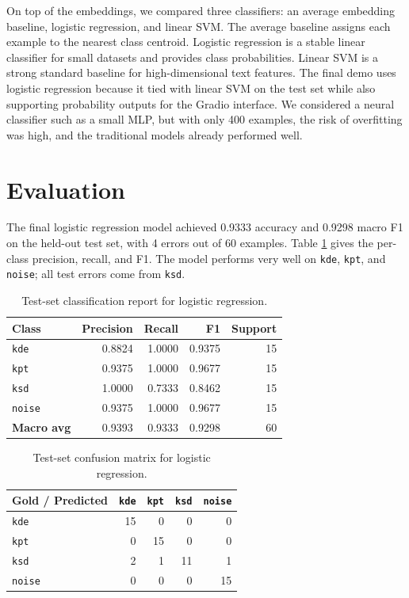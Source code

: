 \documentclass[11pt,a4paper]{article}
\begin{document}
On top of the embeddings, we compared three classifiers: an average embedding baseline, logistic regression, and linear SVM. The average baseline assigns each example to the nearest class centroid. Logistic regression is a stable linear classifier for small datasets and provides class probabilities. Linear SVM is a strong standard baseline for high-dimensional text features. The final demo uses logistic regression because it tied with linear SVM on the test set while also supporting probability outputs for the Gradio interface. We considered a neural classifier such as a small MLP, but with only 400 examples, the risk of overfitting was high, and the traditional models already performed well.

\section{Evaluation}

The final logistic regression model achieved 0.9333 accuracy and 0.9298 macro F1 on the held-out test set, with 4 errors out of 60 examples. Table \ref{tab:perclass} gives the per-class precision, recall, and F1. The model performs very well on \texttt{kde}, \texttt{kpt}, and \texttt{noise}; all test errors come from \texttt{ksd}.

\begin{table}[h]
\centering
\small
\begin{tabular}{lrrrr}
\toprule
\textbf{Class} & \textbf{Precision} & \textbf{Recall} & \textbf{F1} & \textbf{Support} \\
\midrule
\texttt{kde} & 0.8824 & 1.0000 & 0.9375 & 15 \\
\texttt{kpt} & 0.9375 & 1.0000 & 0.9677 & 15 \\
\texttt{ksd} & 1.0000 & 0.7333 & 0.8462 & 15 \\
\texttt{noise} & 0.9375 & 1.0000 & 0.9677 & 15 \\
\midrule
\textbf{Macro avg} & 0.9393 & 0.9333 & 0.9298 & 60 \\
\bottomrule
\end{tabular}
\caption{Test-set classification report for logistic regression.}
\label{tab:perclass}
\end{table}

\begin{table}[h]
\centering
\small
\begin{tabular}{lrrrr}
\toprule
\textbf{Gold / Predicted} & \texttt{kde} & \texttt{kpt} & \texttt{ksd} & \texttt{noise} \\
\midrule
\texttt{kde} & 15 & 0 & 0 & 0 \\
\texttt{kpt} & 0 & 15 & 0 & 0 \\
\texttt{ksd} & 2 & 1 & 11 & 1 \\
\texttt{noise} & 0 & 0 & 0 & 15 \\
\bottomrule
\end{tabular}
\caption{Test-set confusion matrix for logistic regression.}
\label{tab:confusion}
\end{table}
\end{document}
